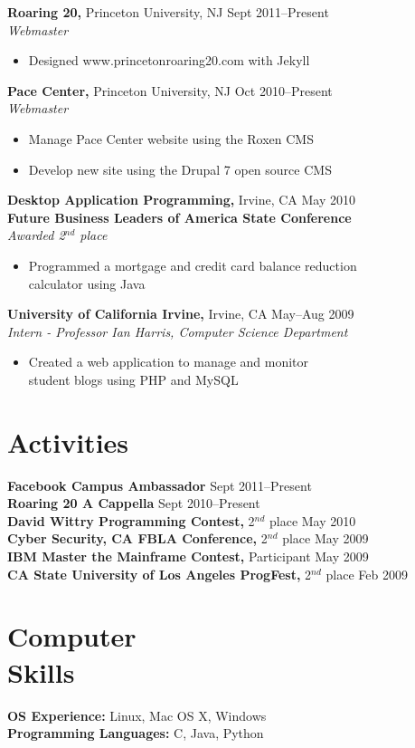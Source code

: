 \documentclass[margin]{res}
\begin{document}
\begin{resume}
 {\bf Roaring 20,} Princeton University, NJ \hfill Sept 2011--Present \\
 {\it Webmaster}
 \begin{itemize} \itemsep -2pt  %
 \item Designed www.princetonroaring20.com with Jekyll
 \end{itemize}

 {\bf Pace Center,} Princeton University, NJ \hfill Oct 2010--Present \\
 {\it Webmaster}
 \begin{itemize} \itemsep -2pt  %
 \item Manage Pace Center website using the Roxen CMS
 \item Develop new site using the Drupal 7 open source CMS
 \end{itemize}
 
 {\bf Desktop Application Programming,} Irvine, CA \hfill May 2010 \\
 {\bf Future Business Leaders of America State Conference} \\
 {\it Awarded 2$^{nd}$ place}
 \begin{itemize} \itemsep -2pt  %
 \item Programmed a mortgage and credit card balance reduction \\ 
   calculator using Java
 \end{itemize}

 {\bf University of California Irvine,} Irvine, CA \hfill May--Aug
 2009 \\
 {\it Intern - Professor Ian Harris, Computer Science Department}
 \begin{itemize} \itemsep -2pt  %
 \item Created a web application to manage and monitor \\
   student blogs using PHP and MySQL 
 \end{itemize}


 
\section{Activities}
 {\bf Facebook Campus Ambassador} \hfill Sept 2011--Present \\
 {\bf Roaring 20 A Cappella} \hfill Sept 2010--Present \\
 {\bf David Wittry Programming Contest,} 2$^{nd}$ place \hfill May 2010 \\
 {\bf Cyber Security, CA FBLA Conference,} 2$^{nd}$ place \hfill May 2009 \\
 {\bf IBM Master the Mainframe Contest,} Participant \hfill May 2009 \\
 {\bf CA State University of Los Angeles ProgFest,}
 2$^{nd}$ place \hfill Feb 2009



\section{Computer \\ Skills}
 {\bf OS Experience:} Linux, Mac OS X, Windows \\
 {\bf Programming Languages:} C, Java, Python

\end{resume} 
\end{document}
